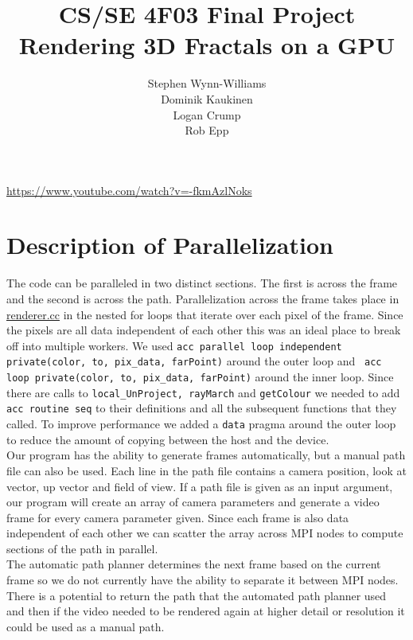 \documentclass[]{article}
\title{CS/SE 4F03 Final Project \\ Rendering 3D Fractals on a GPU}
\author{Stephen Wynn-Williams \\ Dominik Kaukinen \\Logan Crump \\ Rob Epp }
\begin{document}
\maketitle
\url{https://www.youtube.com/watch?v=-fkmAzlNoks}
\newpage
\tableofcontents

\newpage
\section{Description of Parallelization}
The code can be paralleled in two distinct sections. The first is across the frame and the second is across the path. Parallelization across the frame takes place in \hyperref[subsec:renderer.cc]{renderer.cc} in the nested for loops that iterate over each pixel of the frame. Since the pixels are all data independent of each other this was an ideal place to break off into multiple workers. We used \texttt{acc parallel loop independent private(color, to, pix\_data, farPoint)} around the outer loop and \texttt{ acc loop private(color, to, pix\_data, farPoint)} around the inner loop. Since there are calls to \texttt{local\_UnProject, rayMarch} and \texttt{getColour} we needed to add \texttt{acc routine seq} to their definitions and all the subsequent functions that they called. To improve performance we added a \texttt{data} pragma around the outer loop to reduce the amount of copying between the host and the device. \\

Our program has the ability to generate frames automatically, but a manual path file can also be used. Each line in the path file contains a camera position, look at vector, up vector and field of view. If a path file is given as an input argument, our program will create an array of camera parameters and generate a video frame for every camera parameter given. Since each frame is also data independent of each other we can scatter the array across MPI nodes to compute sections of the path in parallel. \\

The automatic path planner determines the next frame based on the current frame so we do not currently have the ability to separate it between MPI nodes. There is a potential to return the path that the automated path planner used and then if the video needed to be rendered again at higher detail or resolution it could be used as a manual path.
\end{document}
